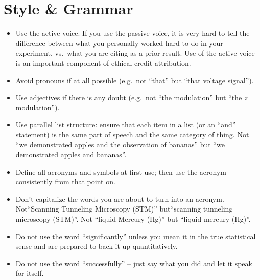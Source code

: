 \documentclass[aps,prb,twocolumn,superscriptaddress,floatfix,longbibliography]{revtex4-2}
\newcounter{para}
\begin{document}
\section{\label{sec:Style}Style \& Grammar}

\begin{itemize}[label=$\Box$]
\item Use the active voice. If you use the passive voice, it is very hard to tell the difference between what you personally worked hard to do in your experiment, vs.\ what you are citing as a prior result. Use of the active voice is an important component of ethical credit attribution.
\item Avoid pronouns if at all possible (e.g.\ not ``that'' but ``that voltage signal'').
\item Use adjectives if there is any doubt (e.g.\ not ``the modulation'' but ``the $z$ modulation'').
\item Use parallel list structure: ensure that each item in a list (or an ``and'' statement) is the same part of speech and the same category of thing. Not ``we demonstrated apples and the observation of bananas'' but ``we demonstrated apples and bananas''.
\item Define all acronyms and symbols at first use; then use the acronym consistently from that point on.
\item Don’t capitalize the words you are about to turn into an acronym. Not``Scanning Tunneling Microscopy (STM)'' but``scanning tunneling microscopy (STM)''. Not ``liquid Mercury (Hg)'' but ``liquid mercury (Hg)''.
\item Do not use the word ``significantly'' unless you mean it in the true statistical sense and are prepared to back it up quantitatively.
\item Do not use the word ``successfully'' -- just say what you did and let it speak for itself.

\end{itemize}
\end{document}
